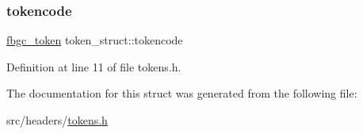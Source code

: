 \subsubsection{\texorpdfstring{tokencode}{tokencode}}
{\footnotesize\ttfamily \hyperlink{tokens_8h_a9d21ebbf42e602eb0cf502c867d20a7e}{fbgc\+\_\+token} token\+\_\+struct\+::tokencode}



Definition at line 11 of file tokens.\+h.



The documentation for this struct was generated from the following file\+:\begin{DoxyCompactItemize}
\item 
src/headers/\hyperlink{tokens_8h}{tokens.\+h}\end{DoxyCompactItemize}
